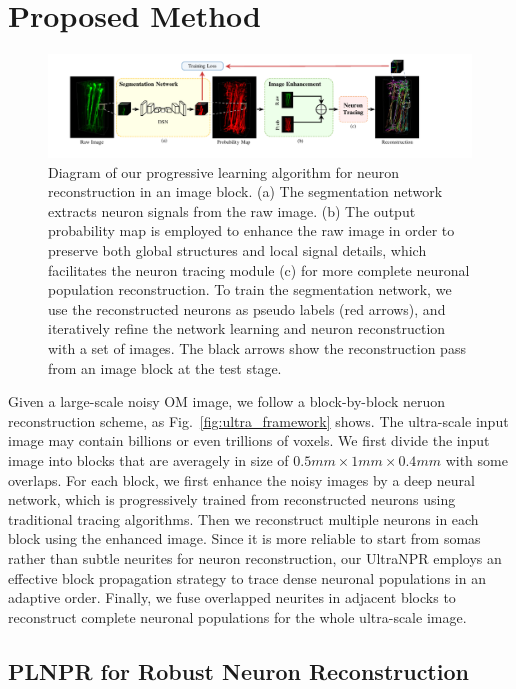 \section{Proposed Method}
\label{sec:method}
\begin{figure}[th]
	\centering
	\includegraphics[width=1\textwidth]{./Illustrations/framework_plnpr.pdf}
	\caption{Diagram of our progressive learning algorithm for neuron reconstruction in an image block. (a) The segmentation network extracts neuron signals from the raw image. (b) The output probability map is employed to enhance the raw image in order to preserve both global structures and local signal details, which facilitates the neuron tracing module (c) for more complete neuronal population reconstruction. To train the segmentation network, we use the reconstructed neurons as pseudo labels (red arrows), and iteratively refine the network learning and neuron reconstruction with a set of images. The black arrows show the reconstruction pass from an image block at the test stage.}
	\label{fig:framework}
\end{figure}


Given a large-scale noisy OM image, we follow a block-by-block neruon reconstruction scheme, as Fig.~\ref{fig:ultra_framework} shows. 
%
The ultra-scale input image may contain billions or even trillions of voxels.
We first divide the input image into blocks that are averagely in size of $0.5mm\times 1mm\times 0.4mm$ with some overlaps. 
%
For each block, we first enhance the noisy images by a deep neural network, which is progressively trained from reconstructed neurons using traditional tracing algorithms. 
Then we reconstruct multiple neurons in each block using the enhanced image. 
%
Since it is more reliable to start from somas rather than subtle neurites for neuron reconstruction, our UltraNPR employs an effective block propagation strategy to trace dense neuronal populations in an adaptive order. 
Finally, we fuse overlapped neurites in adjacent blocks to reconstruct complete neuronal populations for the whole ultra-scale image.

\subsection{PLNPR for Robust Neuron Reconstruction}
\label{sec:PLNPR}



